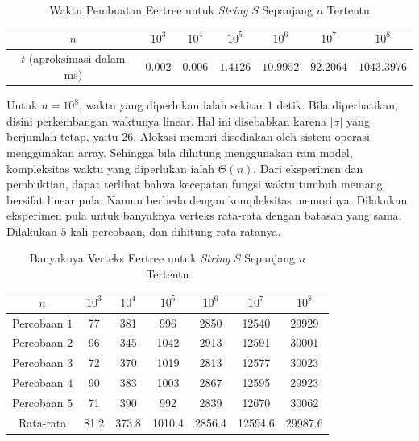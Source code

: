 \documentclass[11pt, a4paper, final]{article}
\begin{document}
\begin{table}[h]
    \centering
    \begin{tabular}{|c|c|c|c|c|c|c|}
    \hline
        $n$ & $10^3$ & $10^4$ & $10^5$ & $10^6$ & $10^7$ & $10^8$\\
    \hline
        $t$ (aproksimasi dalam ms) & $0.002 $ & $0.006$ & $1.4126$ & $10.9952$ & $92.2064$ & $1043.3976$\\
    \hline
    \end{tabular}
    \caption{Waktu Pembuatan Eertree untuk \textit{String} $S$ Sepanjang $n$ Tertentu}
\end{table}

Untuk $n = 10^8$, waktu yang diperlukan ialah sekitar $1$ detik. Bila diperhatikan, disini perkembangan waktunya linear. Hal ini disebabkan karena $|\sigma|$ yang berjumlah tetap, yaitu $26$. Alokasi memori disediakan oleh sistem operasi menggunakan array. Sehingga bila dihitung menggunakan ram model, kompleksitas waktu yang diperlukan ialah $\Theta(n)$. Dari eksperimen dan pembuktian, dapat terlihat bahwa kecepatan fungsi waktu tumbuh memang bersifat linear pula. Namun berbeda dengan kompleksitas memorinya. Dilakukan eksperimen pula untuk banyaknya verteks rata-rata dengan batasan yang sama. Dilakukan $5$ kali percobaan, dan dihitung rata-ratanya.

\begin{table}[h]
    \centering
    \begin{tabular}{|c|c|c|c|c|c|c|}
    \hline
        $n$ & $10^3$ & $10^4$ & $10^5$ & $10^6$ & $10^7$ & $10^8$\\
    \hline
    \hline
Percobaan $1$ & 77 & 381 & 996 & 2850 & 12540 & 29929 \\ \hline
Percobaan $2$ & 96 & 345 & 1042 & 2913 & 12591 & 30001 \\ \hline
Percobaan $3$ & 72 & 370 & 1019 & 2813 & 12577 & 30023 \\ \hline
Percobaan $4$ & 90 & 383 & 1003 & 2867 & 12595 & 29923 \\ \hline
Percobaan $5$ & 71 & 390 & 992 & 2839 & 12670 & 30062 \\ \hline
Rata-rata & 81.2 & 373.8 & 1010.4 & 2856.4 & 12594.6 & 29987.6 \\ \hline
    \end{tabular}
    \caption{Banyaknya Verteks Eertree untuk \textit{String} $S$ Sepanjang $n$ Tertentu}
\end{table}
\end{document}
